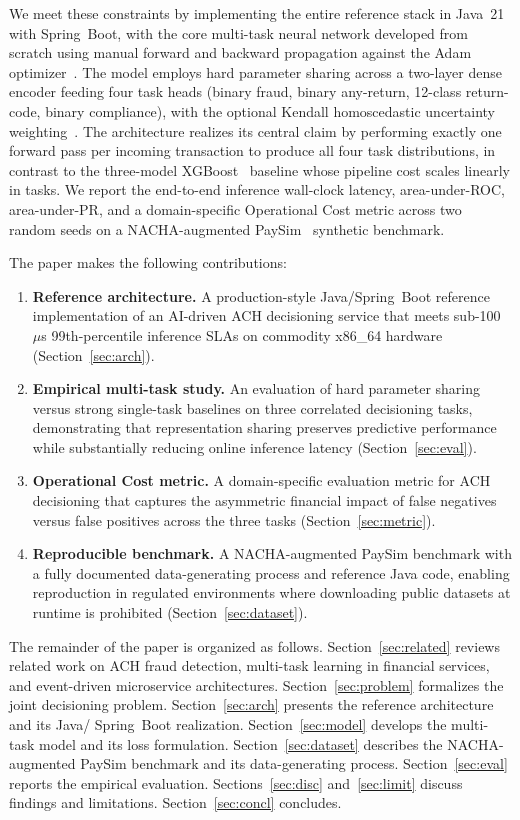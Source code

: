 \documentclass[11pt,a4paper]{article}
\begin{document}
We meet these constraints by implementing the entire reference stack in
Java~21 with Spring~Boot, with the core multi-task neural network developed
from scratch using manual forward and backward propagation against the
Adam optimizer~\cite{kingma2015}. The model employs hard parameter sharing
across a two-layer dense encoder feeding four task heads (binary fraud,
binary any-return, 12-class return-code, binary compliance), with the
optional Kendall homoscedastic uncertainty weighting~\cite{kendall2018}.
The architecture realizes its central claim by performing exactly one
forward pass per incoming transaction to produce all four task
distributions, in contrast to the three-model XGBoost~\cite{chen2016}
baseline whose pipeline cost scales linearly in tasks. We report the
end-to-end inference wall-clock latency, area-under-ROC, area-under-PR, and
a domain-specific Operational Cost metric across two random seeds on a
NACHA-augmented PaySim~\cite{lopez2016} synthetic benchmark.

The paper makes the following contributions:

\begin{enumerate}
    \item \textbf{Reference architecture.} A production-style Java/Spring~Boot
    reference implementation of an AI-driven ACH decisioning service that
    meets sub-100~$\mu$s 99th-percentile inference SLAs on commodity x86\_64
    hardware (Section~\ref{sec:arch}).
    \item \textbf{Empirical multi-task study.} An evaluation of hard
    parameter sharing versus strong single-task baselines on three correlated
    decisioning tasks, demonstrating that representation sharing preserves
    predictive performance while substantially reducing online inference
    latency (Section~\ref{sec:eval}).
    \item \textbf{Operational Cost metric.} A domain-specific evaluation
    metric for ACH decisioning that captures the asymmetric financial impact
    of false negatives versus false positives across the three tasks
    (Section~\ref{sec:metric}).
    \item \textbf{Reproducible benchmark.} A NACHA-augmented PaySim benchmark
    with a fully documented data-generating process and reference Java
    code, enabling reproduction in regulated environments where downloading
    public datasets at runtime is prohibited (Section~\ref{sec:dataset}).
\end{enumerate}

The remainder of the paper is organized as follows. Section~\ref{sec:related}
reviews related work on ACH fraud detection, multi-task learning in
financial services, and event-driven microservice architectures.
Section~\ref{sec:problem} formalizes the joint decisioning problem.
Section~\ref{sec:arch} presents the reference architecture and its Java/
Spring~Boot realization. Section~\ref{sec:model} develops the multi-task
model and its loss formulation. Section~\ref{sec:dataset} describes the
NACHA-augmented PaySim benchmark and its data-generating process.
Section~\ref{sec:eval} reports the empirical evaluation. Sections~\ref{sec:disc}
and~\ref{sec:limit} discuss findings and limitations. Section~\ref{sec:concl}
concludes.
\end{document}
